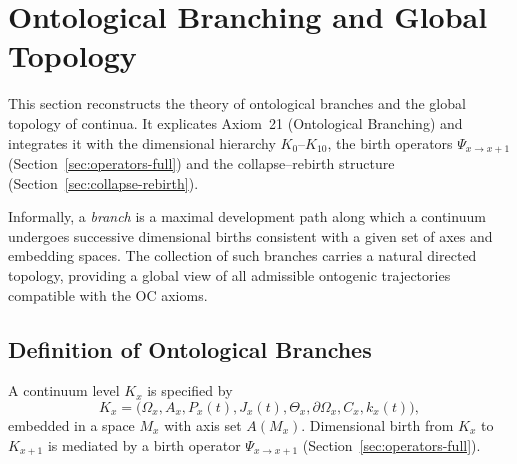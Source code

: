 
\section{Ontological Branching and Global Topology}
\label{sec:branching-topology}

This section reconstructs the theory of ontological branches and the global
topology of continua. It explicates Axiom~21 (Ontological Branching) and
integrates it with the dimensional hierarchy \(K_0\)–\(K_{10}\), the birth
operators \(\Psi_{x\to x+1}\) (Section~\ref{sec:operators-full}) and the
collapse–rebirth structure (Section~\ref{sec:collapse-rebirth}).

Informally, a \emph{branch} is a maximal development path along which a
continuum undergoes successive dimensional births consistent with a given set
of axes and embedding spaces. The collection of such branches carries a natural
directed topology, providing a global view of all admissible ontogenic
trajectories compatible with the OC axioms.

\subsection{Definition of Ontological Branches}

A continuum level \(K_x\) is specified by
\[
  K_x =
  \big(
    \Omega_x, A_x, P_x(t), J_x(t),
    \Theta_x, \partial\Omega_x, C_x, k_x(t)
  \big),
\]
embedded in a space \(M_x\) with axis set \(A(M_x)\). Dimensional birth from
\(K_x\) to \(K_{x+1}\) is mediated by a birth operator
\(\Psi_{x\to x+1}\) (Section~\ref{sec:operators-full}).

